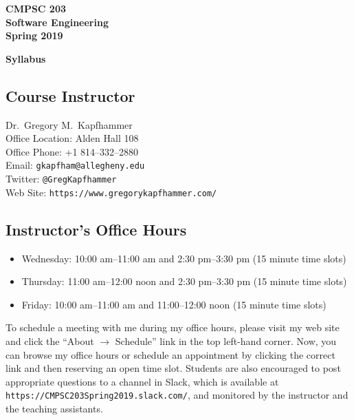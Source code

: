 \documentclass[11pt]{article}
\newcommand{\url}[1]{\lstinline{#1}}
\newcommand{\syllabustitle}[1]
{
  \begin{center}
    \begin{center}
      \bf
      CMPSC 203\\Software Engineering\\
      Spring 2019\\
      \medskip
    \end{center}
    \bf
    #1
  \end{center}
}
\begin{document}
\thispagestyle{empty}

\syllabustitle{Syllabus}

\vspace*{-1em}
\subsection*{Course Instructor}
Dr.\ Gregory M.\ Kapfhammer\\
\noindent Office Location: Alden Hall 108 \\
\noindent Office Phone: +1 814--332--2880 \\
\noindent Email: \url{gkapfham@allegheny.edu} \\
\noindent Twitter: \url{@GregKapfhammer} \\
\noindent Web Site: \url{https://www.gregorykapfhammer.com/}

\subsection*{Instructor's Office Hours}


\begin{itemize}
  \itemsep0em

  \item Wednesday: 10:00 am--11:00 am and 2:30 pm--3:30 pm (15 minute time slots)

  \item Thursday: 11:00 am--12:00 noon and 2:30 pm--3:30 pm (15 minute time slots)

  \item Friday: 10:00 am--11:00 am and 11:00--12:00 noon (15 minute time slots)


\end{itemize}

\noindent To schedule a meeting with me during my office hours, please visit my
web site and click the ``About $\rightarrow$ Schedule'' link in the top left-hand corner. Now, you
can browse my office hours or schedule an appointment by clicking the correct
link and then reserving an open time slot. Students are also encouraged to post
appropriate questions to a channel in Slack, which is available at
\url{https://CMPSC203Spring2019.slack.com/}, and monitored by the instructor and
the teaching assistants.
\end{document}

